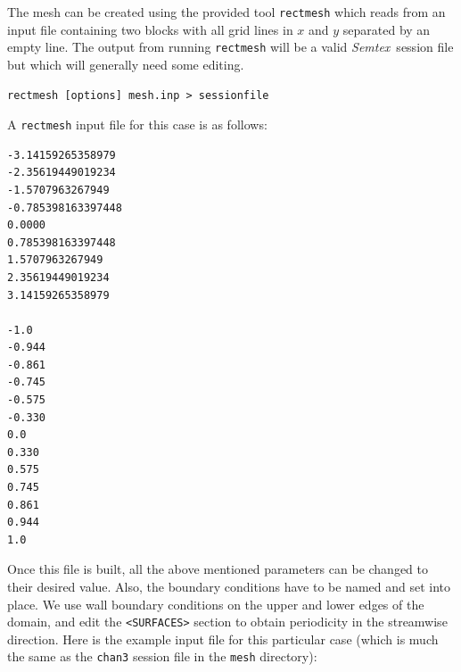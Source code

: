 \documentclass[11pt]{report}
\newcommand{\Semtex}{\emph{Semtex}} \newcommand{\Dog}{\emph{Dog}}
\begin{document}

The mesh can be created using the provided tool \texttt{rectmesh}
which reads from an input file containing two blocks with all grid
lines in $x$ and $y$ separated by an empty line. The output from
running \verb|rectmesh| will be a valid \Semtex\ session file but which
will generally need some editing. 

{\small
\begin{verbatim}
rectmesh [options] mesh.inp > sessionfile
\end{verbatim}
}

A \verb|rectmesh| input file for this case is as follows: {\small
\begin{verbatim}
-3.14159265358979
-2.35619449019234
-1.5707963267949
-0.785398163397448
0.0000
0.785398163397448
1.5707963267949
2.35619449019234
3.14159265358979

-1.0
-0.944
-0.861
-0.745
-0.575
-0.330
0.0
0.330
0.575
0.745
0.861
0.944
1.0
\end{verbatim}
}

Once this file is built, all the above mentioned parameters can be
changed to their desired value. Also, the boundary conditions have to
be named and set into place.  We use wall boundary conditions on the
upper and lower edges of the domain, and edit the \verb|<SURFACES>|
section to obtain periodicity in the streamwise direction. Here is the
example input file for this particular case (which is much the same as
the \verb|chan3| session file in the \verb |mesh| directory):
\end{document}
